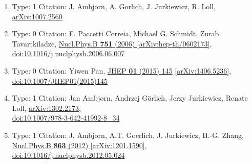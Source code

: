 \documentclass[a4paper,10pt]{article}
\begin{document}
\begin{enumerate}
\begin{enumerate}
  \item Type: 1 Citation: J. Ambjorn, A. Gorlich, J. Jurkiewicz, R. Loll, \href{https://arxiv.org/abs/1007.2560}{arXiv:1007.2560}
  \item Type: 0 Citation: F. Paccetti Correia, Michael G. Schmidt, Zurab Tavartkiladze, \href{https://www.doi.org/10.1016/j.nuclphysb.2006.06.007}{Nucl.Phys.B {\bf 751} (2006) }  \href{https://arxiv.org/abs/hep-th/0602173}{[arXiv:hep-th/0602173]},\\\href{https://www.doi.org/10.1016/j.nuclphysb.2006.06.007}{doi:10.1016/j.nuclphysb.2006.06.007}
  \item Type: 0 Citation: Yiwen Pan, \href{https://www.doi.org/10.1007/JHEP01(2015)145}{JHEP {\bf 01} (2015) 145}  \href{https://arxiv.org/abs/1406.5236}{[arXiv:1406.5236]},\\\href{https://www.doi.org/10.1007/JHEP01(2015)145}{doi:10.1007/JHEP01(2015)145}
  \item Type: 1 Citation: Jan Ambjørn, Andrzej Görlich, Jerzy Jurkiewicz, Renate Loll, \href{https://arxiv.org/abs/1302.2173}{arXiv:1302.2173},\\\href{https://www.doi.org/10.1007/978-3-642-41992-8_34}{doi:10.1007/978-3-642-41992-8\_34}
  \item Type: 1 Citation: J. Ambjorn, A.T. Goerlich, J. Jurkiewicz, H.-G. Zhang, \href{https://www.doi.org/10.1016/j.nuclphysb.2012.05.024}{Nucl.Phys.B {\bf 863} (2012) }  \href{https://arxiv.org/abs/1201.1590}{[arXiv:1201.1590]},\\\href{https://www.doi.org/10.1016/j.nuclphysb.2012.05.024}{doi:10.1016/j.nuclphysb.2012.05.024}

\end{enumerate}
\end{enumerate}
\end{document}
